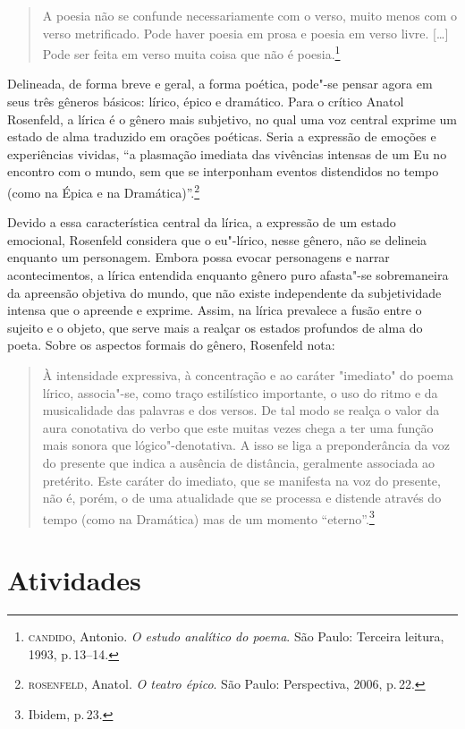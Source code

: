 \documentclass[11pt]{extarticle}
\begin{document}
\begin{quote}
A poesia não se confunde necessariamente com o verso, muito menos com o verso metrificado. Pode haver poesia em prosa e poesia em verso livre. [\ldots]
Pode ser feita em verso muita coisa que não é poesia.\footnote{\textsc{candido}, Antonio. \textit{O estudo analítico do poema}. São Paulo: Terceira leitura, 1993, p.\,13--14.}
\end{quote}

Delineada, de forma breve e geral, a forma poética, pode"-se pensar agora em seus três gêneros básicos: lírico, épico e dramático.
Para o crítico Anatol Rosenfeld, a lírica é o gênero mais subjetivo, no qual uma voz central exprime um estado de alma traduzido em orações poéticas.
Seria a expressão de emoções e experiências vividas, ``a plasmação imediata das vivências intensas de um Eu no encontro com o mundo, sem que se interponham eventos distendidos no tempo (como na Épica e na Dramática)''.\footnote{\textsc{rosenfeld}, Anatol. \textit{O teatro épico}. São Paulo: Perspectiva, 2006, p.\,22.}

Devido a essa característica central da lírica, a expressão de um estado emocional, Rosenfeld considera que o eu"-lírico, nesse gênero, não se delineia enquanto um personagem. Embora possa evocar personagens e narrar acontecimentos, a lírica entendida enquanto gênero puro afasta"-se sobremaneira da apreensão objetiva do mundo, que não existe independente da subjetividade intensa que o apreende e exprime. Assim, na lírica prevalece a fusão entre o sujeito e o objeto, que serve mais a realçar os estados profundos de alma do poeta.
Sobre os aspectos formais do gênero, Rosenfeld nota:

\begin{quote}
À intensidade expressiva, à concentração e ao caráter "imediato" do poema lírico, associa"-se, como traço estilístico importante, o uso do ritmo e da musicalidade das palavras e dos versos. De tal modo se realça o valor da aura conotativa do verbo que este muitas vezes chega a ter uma função mais sonora que lógico"-denotativa. A isso se liga a preponderância da voz do presente que indica a ausência de distância, geralmente associada ao pretérito. Este caráter do imediato, que se manifesta na voz do presente, não é, porém, o de uma atualidade que se processa e distende através do tempo (como na Dramática) mas de um momento ``eterno''.\footnote{Ibidem, p.\,23.}
\end{quote}


\section{Atividades}
\end{document}
